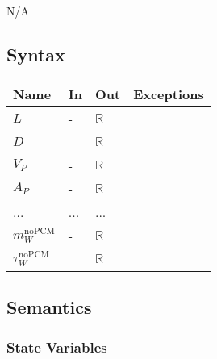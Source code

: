\documentclass[12pt]{article}
\begin{document}
N/A

\subsection{Syntax}

\begin{tabular}{p{3cm} p{1cm} p{1cm} >{\raggedright\arraybackslash}p{9cm}}
\toprule
\textbf{Name} & \textbf{In} & \textbf{Out} & \textbf{Exceptions} \\
\midrule
$L$ & - & $\mathbb{R}$\\
$D$ & - & $\mathbb{R}$\\
$V_P$ & - & $\mathbb{R}$\\
$A_P$ & - & $\mathbb{R}$\\
... & ... & ...\\
$m_W^{\text{noPCM}}$ & - & $\mathbb{R}$ \\
$\tau_W^{\text{noPCM}}$ & - & $\mathbb{R}$\\
\bottomrule
\end{tabular}

\subsection{Semantics}

\subsubsection{State Variables}
\end{document}
